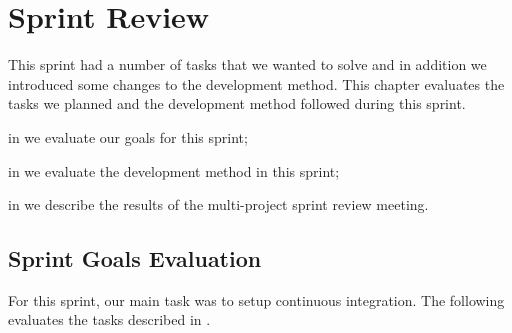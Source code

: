 \chapter{Sprint Review}\label{chap:sprint1_end}
This sprint had a number of tasks that we wanted to solve and in addition we introduced some changes to the development method. This chapter evaluates the tasks we planned and the development method followed during this sprint.

\begin{chapterorganization}
  \item in  we evaluate our goals for this sprint;
  \item in  we evaluate the development method in this sprint;
  \item in  we describe the results of the multi-project sprint review meeting.
\end{chapterorganization}

\section{Sprint Goals Evaluation}\label{sec:s1_goals}
For this sprint, our main task was to setup continuous integration. The following evaluates the tasks described in .

